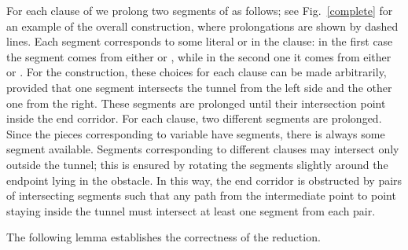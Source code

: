 \documentclass[11pt,a4paper]{article}
\begin{document}
For each clause of  we prolong two segments of  as follows; see Fig.~\ref{complete} for an example of the overall construction, where prolongations are shown by dashed lines. Each segment corresponds to some literal  or  in the clause: in the first case the segment comes from either  or , while in the second one it comes from either  or . For the construction, these choices for each clause can be made arbitrarily, provided that one segment intersects the tunnel from the left side and the other one from the right. These segments are prolonged until their intersection point inside the end corridor. For each clause, two different segments are prolonged. Since the pieces corresponding to variable  have  segments, there is always some segment available. 
Segments corresponding to different clauses may intersect only outside the tunnel; this is ensured by rotating the segments slightly around the endpoint lying in the obstacle. In this way, the end corridor is obstructed by  pairs of intersecting segments such that any path from the intermediate point  to point  staying inside the tunnel must intersect at least one segment from each pair.  

The following lemma establishes the correctness of the reduction. 
\end{document}
